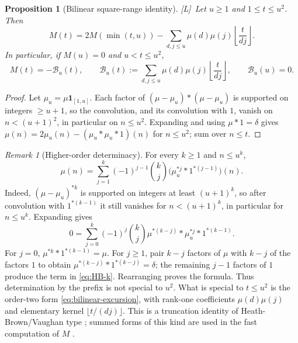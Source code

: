 \documentclass[11pt,reqno]{amsart}
\numberwithin{equation}{section}
\theoremstyle{plain}
\newtheorem{proposition}[theorem]{Proposition}
\theoremstyle{definition}
\theoremstyle{remark}
\newtheorem{remark}[theorem]{Remark}
\newcommand{\tagL}{\textup{[L]}}
\begin{document}
\begin{proposition}[Bilinear square-range identity]
\label{prop:prefix-bilinear}
\tagL\ Let $u\ge1$ and $1\le t\le u^2$. Then
\begin{equation}
\label{eq:bilinear-general}
M(t)=2M(\min(t,u))-
\sum_{d,j\le u}\mu(d)\mu(j)\left\lfloor\frac{t}{dj}\right\rfloor.
\end{equation}
In particular, if $M(u)=0$ and $u<t\le u^2$,
\begin{equation}
\label{eq:bilinear-excursion}
M(t)=-\mathcal B_u(t),\qquad
\mathcal B_u(t):=\sum_{d,j\le u}\mu(d)\mu(j)
\left\lfloor\frac{t}{dj}\right\rfloor,
\qquad \mathcal B_u(u)=0.
\end{equation}
\end{proposition}

\begin{proof}
Let $\mu_u=\mu\mathbf1_{[1,u]}$. Each factor of $(\mu-\mu_u)*(\mu-\mu_u)$ is
supported on integers $\ge u+1$, so the convolution, and its convolution
with $1$, vanish on $n<(u+1)^2$, in particular on $n\le u^2$. Expanding and using $\mu*1=\delta$ gives
$\mu(n)=2\mu_u(n)-(\mu_u*\mu_u*1)(n)$ for $n\le u^2$; sum over $n\le t$.
\end{proof}

\begin{remark}[Higher-order determinacy]
\label{rem:prefix-k}
For every $k\ge1$ and $n\le u^k$,
\begin{equation}
\label{eq:HB-k}
\mu(n)=\sum_{j=1}^{k}(-1)^{j-1}\binom{k}{j}
\bigl(\mu_u^{*j}*1^{*(j-1)}\bigr)(n).
\end{equation}
Indeed, $(\mu-\mu_u)^{*k}$ is supported on integers at least
$(u+1)^k$, so after convolution with $1^{*(k-1)}$ it still vanishes for
$n<(u+1)^k$, in particular for $n\le u^k$.  Expanding gives
\begin{equation}
0=\sum_{j=0}^{k}(-1)^j\binom{k}{j}
\mu^{*(k-j)}*\mu_u^{*j}*1^{*(k-1)}.
\end{equation}
For $j=0$, $\mu^{*k}*1^{*(k-1)}=\mu$.  For $j\ge1$, pair
$k-j$ factors of $\mu$ with $k-j$ of the factors $1$ to obtain
$\mu^{*(k-j)}*1^{*(k-j)}=\delta$; the remaining $j-1$ factors of $1$
produce the term in \eqref{eq:HB-k}.  Rearranging proves the formula.
Thus determination by the prefix
is not special to $u^2$. What is special to $t\le u^2$ is the order-two form
\eqref{eq:bilinear-excursion}, with rank-one coefficients $\mu(d)\mu(j)$ and
elementary kernel $\lfloor t/(dj)\rfloor$. This is a truncation identity of
Heath-Brown/Vaughan type \cite{HB82}; summed forms of this kind are used in
the fast computation of $M$ \cite{HT23}.
\end{remark}
\end{document}
